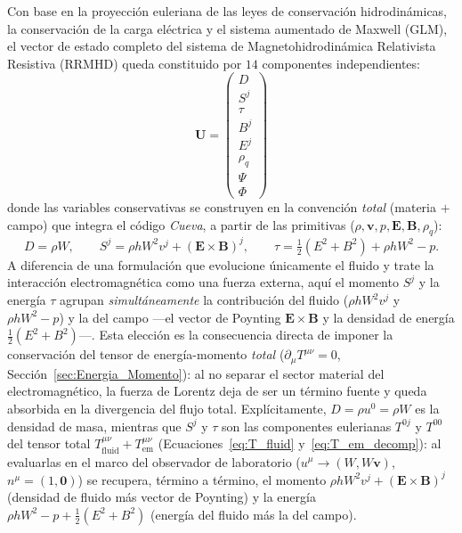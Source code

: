 Con base en la proyección euleriana de las leyes de conservación hidrodinámicas, la conservación de la carga eléctrica y el sistema aumentado de Maxwell (GLM), el vector de estado completo del sistema de Magnetohidrodinámica Relativista Resistiva (RRMHD) queda constituido por $14$ componentes independientes:
\begin{equation}
    \mathbf{U} =
    \begin{pmatrix}
        D \\
        S^j \\
        \tau \\
        B^j \\
        E^j \\
        \rho_q \\
        \Psi \\
        \Phi
    \end{pmatrix}
\end{equation}
donde las variables conservativas se construyen en la convención \emph{total} (materia $+$ campo) que integra el código \textit{Cueva}, a partir de las primitivas ($\rho, \mathbf{v}, p, \mathbf{E}, \mathbf{B}, \rho_q$):
\begin{equation}
\label{eq:def_conservativas}
    D = \rho W, \qquad
    S^j = \rho h W^2 v^j + (\mathbf{E}\times\mathbf{B})^j, \qquad
    \tau = \tfrac{1}{2}\!\left(E^2+B^2\right) + \rho h W^2 - p .
\end{equation}
A diferencia de una formulación que evolucione únicamente el fluido y trate la interacción electromagnética como una fuerza externa, aquí el momento $S^j$ y la energía $\tau$ agrupan \emph{simultáneamente} la contribución del fluido ($\rho h W^2 v^j$ y $\rho h W^2 - p$) y la del campo —el vector de Poynting $\mathbf{E}\times\mathbf{B}$ y la densidad de energía $\tfrac{1}{2}(E^2+B^2)$—. Esta elección es la consecuencia directa de imponer la conservación del tensor de energía-momento \emph{total} ($\partial_\mu T^{\mu\nu} = 0$, Sección~\ref{sec:Energia_Momento}): al no separar el sector material del electromagnético, la fuerza de Lorentz deja de ser un término fuente y queda absorbida en la divergencia del flujo total. Explícitamente, $D = \rho u^0 = \rho W$ es la densidad de masa, mientras que $S^j$ y $\tau$ son las componentes eulerianas $T^{0j}$ y $T^{00}$ del tensor total $T^{\mu\nu}_{\text{fluid}} + T^{\mu\nu}_{\text{em}}$ (Ecuaciones~\eqref{eq:T_fluid} y~\eqref{eq:T_em_decomp}): al evaluarlas en el marco del observador de laboratorio ($u^\mu \to (W, W\mathbf{v})$, $n^\mu = (1,\mathbf{0})$) se recupera, término a término, el momento $\rho h W^2 v^j + (\mathbf{E}\times\mathbf{B})^j$ (densidad de fluido más vector de Poynting) y la energía $\rho h W^2 - p + \tfrac{1}{2}(E^2+B^2)$ (energía del fluido más la del campo).

